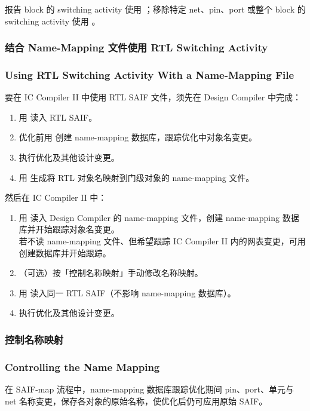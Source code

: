 报告 block 的 switching activity 使用 ；移除特定 net、pin、port 或整个 block 的 switching activity 使用 。

\subsubsection{结合 Name-Mapping 文件使用 RTL Switching Activity}
\subsubsection*{Using RTL Switching Activity With a Name-Mapping File}

要在 IC Compiler II 中使用 RTL SAIF 文件，须先在 Design Compiler 中完成：
\begin{enumerate}
  \item 用  读入 RTL SAIF。
  \item 优化前用  创建 name-mapping 数据库，跟踪优化中对象名变更。
  \item 执行优化及其他设计变更。
  \item 用  生成将 RTL 对象名映射到门级对象的 name-mapping 文件。
\end{enumerate}

然后在 IC Compiler II 中：
\begin{enumerate}
  \item 用  读入 Design Compiler 的 name-mapping 文件，创建 name-mapping 数据库并开始跟踪对象名变更。\\
        若不读 name-mapping 文件、但希望跟踪 IC Compiler II 内的网表变更，可用  创建数据库并开始跟踪。
  \item （可选）按「控制名称映射」手动修改名称映射。
  \item 用  读入同一 RTL SAIF（不影响 name-mapping 数据库）。
  \item 执行优化及其他设计变更。
\end{enumerate}

\subsubsection{控制名称映射}
\subsubsection*{Controlling the Name Mapping}

在 SAIF-map 流程中，name-mapping 数据库跟踪优化期间 pin、port、单元与 net 名称变更，保存各对象的原始名称，使优化后仍可应用原始 SAIF。

